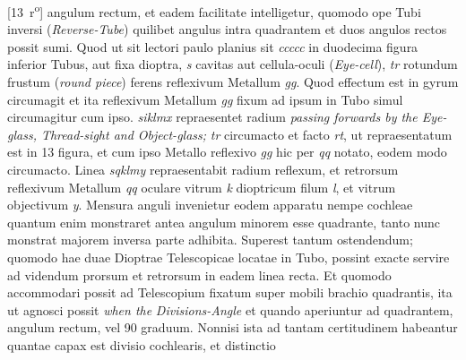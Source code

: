 \hspace{-1.4mm}[13~r\textsuperscript{o}] angulum rectum, et eadem facilitate intelligetur, quomodo ope Tubi  inversi (\textit{Reverse-Tube}) quilibet angulus intra quadrantem\protect{} et duos angulos rectos possit sumi. Quod ut sit lectori paulo planius sit \textit{ccccc} in duodecima figura inferior Tubus, aut fixa dioptra\protect{}, \textit{s} cavitas aut cellula-oculi (\textit{Eye-cell}), \textit{tr} rotundum frustum (\textit{round piece}) ferens reflexivum Metallum \textit{gg}. Quod effectum est in gyrum circumagit et ita reflexivum Metallum \textit{gg} fixum ad ipsum in Tubo simul circumagitur cum ipso. \textit{siklmx} repraesentet radium \textit{passing forwards by the Eye-glass, Thread-sight and Object-glass;}  \textit{tr} circumacto et facto \textit{rt}, ut repraesentatum est in 13 figura, et cum ipso Metallo reflexivo \textit{gg} hic per \textit{qq} notato, eodem modo circumacto. Linea \textit{sqklmy} repraesentabit radium reflexum, et retrorsum  reflexivum Metallum \textit{qq} oculare\protect{} vitrum \textit{k} dioptricum filum \textit{l}, et vitrum objectivum \textit{y}. Mensura anguli invenietur eodem apparatu nempe cochleae quantum enim monstraret antea angulum minorem esse quadrante\protect{}, tanto nunc monstrat majorem inversa parte adhibita. Superest tantum ostendendum;  quomodo hae duae Dioptrae\protect{} Telescopicae\protect{} locatae in Tubo, possint exacte servire ad videndum prorsum et retrorsum in eadem linea recta. Et  quomodo accommodari possit ad Telescopium\protect{} fixatum super mobili brachio quadrantis\protect{}, ita ut agnosci possit \textit{when the} \textit{Divisions-Angle}  et quando aperiuntur ad quadrantem\protect{}, angulum rectum, vel 90 graduum. Nonnisi ista ad tantam certitudinem habeantur quantae capax est divisio coch\-learis, et distinctio
